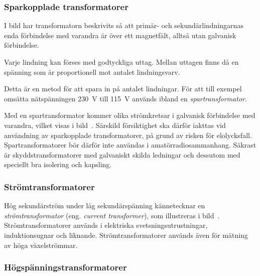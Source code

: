 \subsubsection{Sparkopplade transformatorer}


I bild  har transformatorn beskrivits så att primär- och
sekundärlindningarnas enda förbindelse med varandra är över ett magnetfält,
alltså utan galvanisk förbindelse.

Varje lindning kan förses med godtyckliga uttag. Mellan uttagen finns 
då en spänning som är proportionell mot antalet lindningsvarv.

Detta är en metod för att spara in på antalet lindningar.
För att till exempel omsätta nätspänningen \qty{230}{\volt} till
\qty{115}{\volt} används ibland en \emph{spartransformator}.

Med en spartransformator kommer olika strömkretsar i galvanisk förbindelse med
varandra, vilket visas i bild~.
Särskild försiktighet ska därför iakttas vid användning av sparkopplade
transformatorer, på grund av risken för elolycksfall.
Spartransformatorer bör därför inte användas i amatörradiosammanhang.
Säkrast är skyddstransformatorer med galvaniskt skilda ledningar och dessutom 
med speciellt bra isolering och kapsling.

\subsubsection{Strömtransformatorer}

Hög sekundärström under låg sekundärspänning kännetecknar en
\emph{strömtransformator} (eng. \emph{current transformer}),
som illustreras i bild~.
Strömtransformatorer används i elektriska svetsningsutrustningar,
induktionsugnar och liknande. Strömtransformatorer används även för mätning 
av höga växelströmmar.


\subsubsection{Högspänningstransformatorer}

